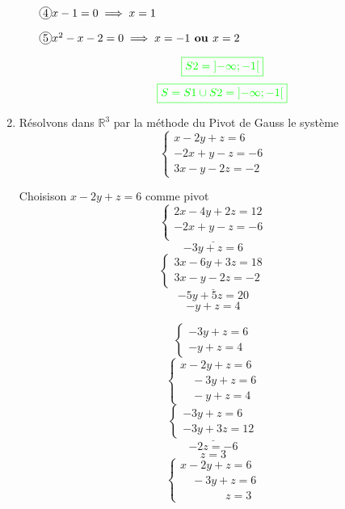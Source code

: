 \documentclass[12pt,a4paper]{article}
\begin{document}
\begin{enumerate}
\begin{enumerate}
\( \encercle{4} x - 1 = 0 \implies x=1\)

\( \encercle{5} x^2 - x - 2 = 0 \implies x=-1 \textbf{ ou } x= 2\)
\begin{flushleft}
\end{flushleft}
\[
\textcolor{green}{\boxed{S2 = \left]-\infty ; -1\right[  }} 
\]
\[
\textcolor{green}{\boxed{S=S1 \cup S2 = \left]-\infty ; -1\right[  }} 
\]
\end{enumerate}
    \item Résolvons dans $\mathbb{R}^3$ par la méthode du Pivot de Gauss le système
    \[
    \begin{cases}
        x - 2y + z = 6 \\
        -2x + y - z = -6 \\
        3x - y - 2z = -2
    \end{cases}
    \]

Choisison $x - 2y + z = 6$ comme pivot 
    \[
\underline{    \begin{cases}
        2x - 4y + 2z = 12 \\
        -2x + y - z = -6 \\
    \end{cases}}
    \]
    \[-3y+z=6\]
    \[
\underline{    \begin{cases}
        3x - 6y + 3z = 18 \\
        3x - y - 2z = -2 
    \end{cases}}
    \]
    \[-5y+5z=20\]
    \[-y+z=4\]

    \[
\begin{cases}
        -3y+z=6 \\
        -y+z=4
    \end{cases}
    \]
        \[
    \begin{cases}
        x - 2y + z = 6 \\
        \quad -3y+z=6 \\
        \quad -y+z=4
    \end{cases}
    \]
    \[
\underline{    \begin{cases}
        -3y+z=6 \\
        -3y+3z=12
    \end{cases}}
    \]
    \[-2z=-6\]
    \[z=3\]
    \[
    \begin{cases}
        x - 2y + z = 6 \\
        \quad -3y+z=6 \\
        \quad\quad\quad\quad z=3
    \end{cases}
    \]
    

\end{enumerate}
\end{document}
